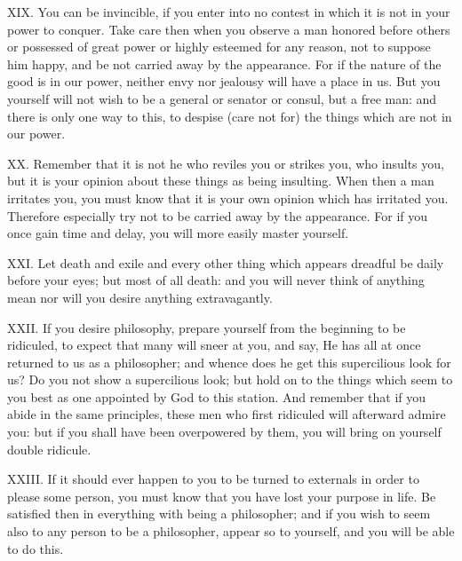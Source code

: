 XIX. You can be invincible, if you enter into no contest in which it is not in your power to conquer. Take care then when you observe a man honored before others or possessed of great power or highly esteemed for any reason, not to suppose him happy, and be not carried away by the appearance. For if the nature of the good is in our power, neither envy nor jealousy will have a place in us. But you yourself will not wish to be a general or senator or consul, but a free man: and there is only one way to this, to despise (care not for) the things which are not in our power.



XX. Remember that it is not he who reviles you or strikes you, who insults you, but it is your opinion about these things as being insulting. When then a man irritates you, you must know that it is your own opinion which has irritated you. Therefore especially try not to be carried away by the appearance. For if you once gain time and delay, you will more easily master yourself.



XXI. Let death and exile and every other thing which appears dreadful be daily before your eyes; but most of all death: and you will never think of anything mean nor will you desire anything extravagantly.



XXII. If you desire philosophy, prepare yourself from the beginning to be ridiculed, to expect that many will sneer at you, and say, He has all at once returned to us as a philosopher; and whence does he get this supercilious look for us? Do you not show a supercilious look; but hold on to the things which seem to you best as one appointed by God to this station. And remember that if you abide in the same principles, these men who first ridiculed will afterward admire you: but if you shall have been overpowered by them, you will bring on yourself double ridicule.



XXIII. If it should ever happen to you to be turned to externals in order to please some person, you must know that you have lost your purpose in life. Be satisfied then in everything with being a philosopher; and if you wish to seem also to any person to be a philosopher, appear so to yourself, and you will be able to do this.



